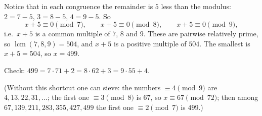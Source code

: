 Notice that in each congruence the remainder is $5$ less than the modulus: $2=7-5$, $3=8-5$, $4=9-5$. So
\[
x+5\equiv0\pmod7,\qquad x+5\equiv0\pmod8,\qquad x+5\equiv0\pmod9,
\]
i.e.\ $x+5$ is a common multiple of $7$, $8$ and $9$. These are pairwise relatively prime, so $\operatorname{lcm}(7,8,9)=504$, and $x+5$ is a positive multiple of $504$. The smallest is $x+5=504$, so $x=\boxed{499}$.

Check: $499=7\cdot71+2=8\cdot62+3=9\cdot55+4$.

(Without this shortcut one can sieve: the numbers $\equiv4\pmod9$ are $4,13,22,31,\dots$; the first one $\equiv3\pmod8$ is $67$, so $x\equiv67\pmod{72}$; then among $67,139,211,283,355,427,499$ the first one $\equiv2\pmod7$ is $499$.)
